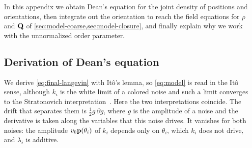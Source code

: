 \documentclass[aps,pre,reprint,superscriptaddress,longbibliography,nofootinbib
]{revtex4-2}
\begin{document}
In this appendix we obtain Dean's equation for the joint
density of positions and orientations, then integrate out
the orientation to reach the field equations for $\rho$ and
$\mathbf{Q}$ of \cref{sec:model-coarse,sec:model-closure}, and
finally explain why we work with the unnormalized order
parameter.

\subsection{Derivation of Dean's equation}
\label{app:dean-approach}
We derive \cref{eq:final-langevin} with It\^o's lemma, so
\cref{eq:model} is read in the It\^o sense, although $k_i$
is the white limit of a colored noise and such a limit
converges to the Stratonovich
interpretation~\cite{wong1965convergence}. Here the two
interpretations coincide. The drift that separates them is
$\tfrac12 g\,\partial g$, where $g$ is the amplitude of a
noise and the derivative is taken along the variables that
this noise drives. It vanishes for both noises: the
amplitude $v_0\mathbf{p}(\theta_i)$ of $k_i$ depends only on
$\theta_i$, which $k_i$ does not drive, and $\lambda_i$ is
additive.
\end{document}
